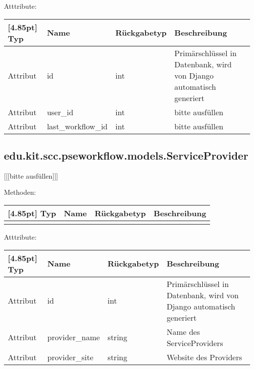 			Atttribute:
			\begin{center}
				\setlength\tabcolsep{5pt}
				\renewcommand{\arraystretch}{1.5}
				
				\begin{tabularx}{\textwidth}{|l|l|l|X|}
					\hline
					\rowcolor[gray]{0.75}[4.85pt]
					Typ & Name & Rückgabetyp & Beschreibung \\ \hline 
					Attribut & id & int & Primärschlüssel in Datenbank, wird von Django automatisch generiert \\ \hline
					Attribut & user\_id & int & bitte ausfüllen \\ \hline
					Attribut & last\_workflow\_id & int & bitte ausfüllen \\
					\hline
				\end{tabularx}
			\end{center}
		
		\subsection{edu.kit.scc.pseworkflow.models.ServiceProvider}
			[[[bitte ausfüllen]]]
			
			Methoden:
			\begin{center}
				\setlength\tabcolsep{5pt}
				\renewcommand{\arraystretch}{1.5}
				
				\begin{tabularx}{\textwidth}{|l|l|l|X|}
					\hline
					\rowcolor[gray]{0.75}[4.85pt]
					Typ & Name & Rückgabetyp & Beschreibung \\ \hline 
					&&& \\
					\hline
				\end{tabularx}
			\end{center}
			
			Atttribute:
			\begin{center}
				\setlength\tabcolsep{5pt}
				\renewcommand{\arraystretch}{1.5}
				
				\begin{tabularx}{\textwidth}{|l|l|l|X|}
					\hline
					\rowcolor[gray]{0.75}[4.85pt]
					Typ & Name & Rückgabetyp & Beschreibung \\ \hline 
					Attribut & id & int & Primärschlüssel in Datenbank, wird von Django automatisch generiert \\ \hline
					Attribut & provider\_name & string & Name des ServiceProviders \\ \hline
					Attribut & provider\_site & string & Website des Providers \\
					\hline
				\end{tabularx}
			\end{center}
		
